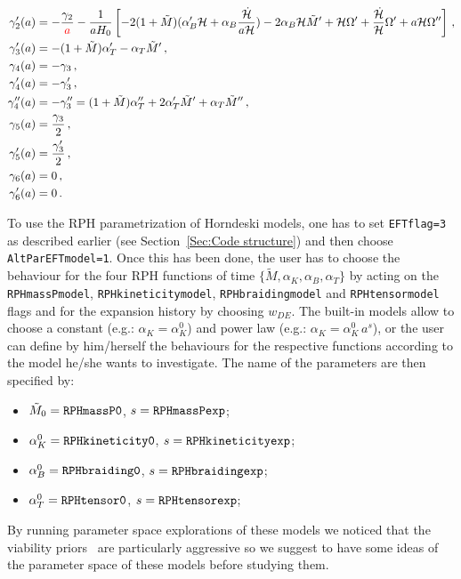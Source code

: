 \documentclass[prd,nofootinbib,showpacs]{revtex4}
\def\l{\left}
\def\r{\right}
\def\f{\frac}
\def\hub{{\mathcal H}}
\begin{document}
{\begin{align}
\gamma_2'(a) &=  -\f{\gamma_2}{\textcolor{red}{a}} -\f{1}{aH_0}\l[-2(1+ \tilde{M})(\alpha_B^\prime\hub+\alpha_B \f{\dot{\hub}}{a\hub}) -2\alpha_B\hub \tilde{M}^\prime+ \hub\Omega^\prime+\f{\dot{\hub}}{\hub}\Omega^\prime+a\hub\Omega^{\prime\prime}\r] \,,  \nonumber \\
\gamma_3'(a) &= -(1+ \tilde{M})\alpha_T^\prime- \alpha_T \tilde{M}^\prime\,,  \nonumber \\
\gamma_4(a) &= -\gamma_3\,,  \nonumber \\
\gamma_4'(a) &= -\gamma_3^\prime\,,  \nonumber \\
\gamma_4''(a) &= -\gamma_3^{\prime\prime}= (1+ \tilde{M})\alpha_T^{\prime\prime}+2\alpha_T^\prime \tilde{M}^\prime + \alpha_T \tilde{M}^{\prime\prime} \,,  \nonumber \\
\gamma_5(a) &= \f{\gamma_3}{2} \,,  \nonumber \\
\gamma_5'(a) &=  \f{\gamma_3^\prime}{2}\,, \nonumber \\
\gamma_6(a) &= 0\,,  \nonumber \\
\gamma_6'(a) &=0 \,.
\end{align}

To use the  RPH  parametrization of Horndeski models, one has to set \verb|EFTflag=3| as described earlier (see Section~\ref{Sec:Code structure}) and then choose \verb|AltParEFTmodel=1|. Once this has been done, the user has to choose the behaviour for the four RPH functions of time $\{\tilde{M},\alpha_K,\alpha_B,\alpha_T\}$  by acting on the \verb|RPHmassPmodel|, \verb|RPHkineticitymodel|, \verb|RPHbraidingmodel| and \verb|RPHtensormodel| flags and for the expansion history by choosing $w_{DE}$. The built-in models allow to choose a constant (e.g.: $\alpha_K=\alpha_K^0$) and power law (e.g.: $\alpha_K = \alpha_K^0\, a^s$), or the  user can define by him/herself the behaviours for the respective functions according to the model he/she wants to investigate. The name of the parameters are then specified by:
%
\begin{itemize}
\item $\tilde{M}_0 = \verb|RPHmassP0|$, $s = \verb|RPHmassPexp|$;
\item $\alpha_{K}^0 = \verb|RPHkineticity0|$, $s = \verb|RPHkineticityexp|$;
\item $\alpha_{B}^0 = \verb|RPHbraiding0|$, $s = \verb|RPHbraidingexp|$;
\item $\alpha_{T}^0 = \verb|RPHtensor0|$, $s = \verb|RPHtensorexp|$;
\end{itemize}
%
By running parameter space explorations of these models we noticed that the viability priors~\cite{Bellini:2014fua} are particularly aggressive so we suggest to have some ideas of the parameter space of these models before studying them.

}
\end{document}
